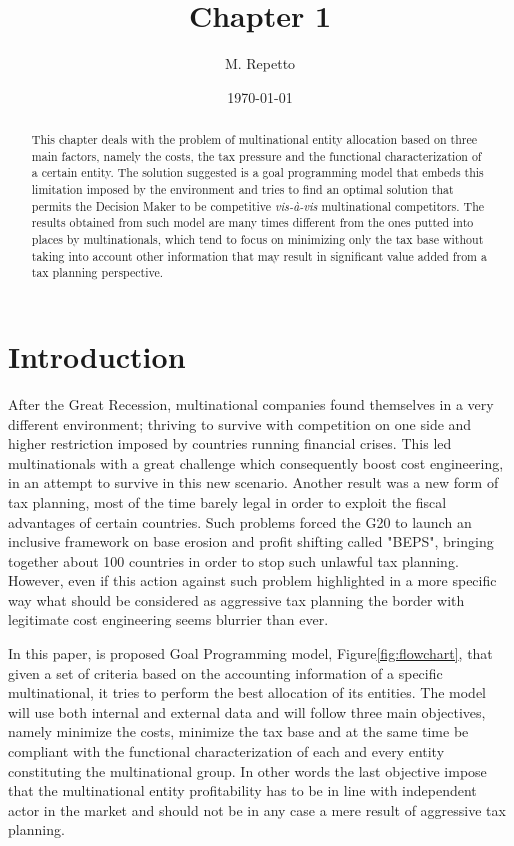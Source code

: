 \documentclass{article}
\begin{document}
\title{Chapter 1}

\author{M. Repetto}

\date{\today}

\maketitle

\begin{abstract}
This chapter deals with the problem of multinational entity allocation based on three main factors, namely the costs, the tax pressure and the functional characterization of a certain entity. The solution suggested is a goal programming model that embeds this limitation imposed by the environment and tries to find an optimal solution that permits the Decision Maker to be competitive \textit{vis-à-vis} multinational competitors. The results obtained from such model are many times different from the ones putted into places by multinationals, which tend to focus on minimizing only the tax base without taking into account other information that may result in significant value added from a tax planning perspective. 
\end{abstract}

\section{Introduction}
After the Great Recession, multinational companies found themselves in a very different environment; thriving to survive with competition on one side and higher restriction imposed by countries running financial crises. This led multinationals with a great challenge which consequently boost cost engineering, in an attempt to survive in this new scenario. Another result was a new form of tax planning, most of the time barely legal in order to exploit the fiscal advantages of certain countries\cite{After_tax_hedging_report_2013}. Such problems forced the G20 to launch an inclusive framework on base erosion and profit shifting called "BEPS", bringing together about 100 countries in order to stop such unlawful tax planning. However, even if this action against such problem highlighted in a more specific way what should be considered as aggressive tax planning the border with legitimate cost engineering seems blurrier than ever\cite{feller_three_2017}.

In this paper, is proposed Goal Programming model, Figure\ref{fig:flowchart}, that given a set of criteria based on the accounting information of a specific multinational, it tries to perform the best allocation of its entities. The model will use both internal and external data and will follow three main objectives, namely minimize the costs, minimize the tax base and at the same time be compliant with the functional characterization of each and every entity constituting the multinational group. In other words the last objective impose that the multinational entity profitability has to be in line with independent actor in the market\cite{Model_Tax_Convention_2015} and should not be in any case a mere result of aggressive tax planning.
\end{document}
